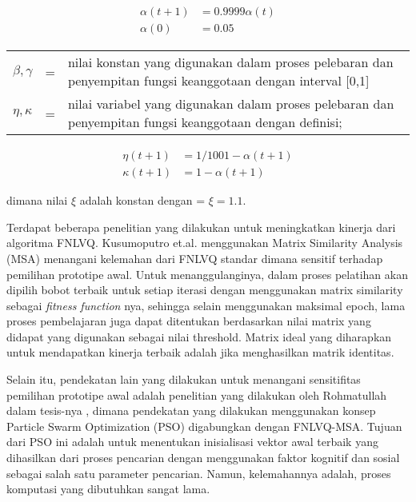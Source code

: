 \begin{small}
	\begin{align}\label{eq:learning_rate}
		\alpha(t+1) &= 0.9999 \alpha(t) \\[0.2cm]
		\alpha(0) &= 0.05 \nonumber
	\end{align}
\end{small}

\begin{tabular}{llp{}}
$\beta, \gamma$ &=& nilai konstan yang digunakan dalam proses pelebaran
dan penyempitan fungsi keanggotaan dengan interval [0,1] \\
$\eta, \kappa$ &=& nilai variabel yang digunakan dalam proses pelebaran
dan penyempitan fungsi keanggotaan dengan definisi;
\end{tabular}

\begin{small}
	\begin{align}\label{eq:fuzziness_value}
	\eta(t+1) &= 1/100 {1-\alpha(t+1)} \\[0.2cm]
	\kappa(t+1) &= 1 - \alpha(t+1) \nonumber
	\end{align}
\end{small}

\noindent dimana nilai $\xi$ adalah konstan dengan = $\xi=1.1$.

Terdapat beberapa penelitian yang dilakukan untuk meningkatkan
kinerja dari algoritma FNLVQ. Kusumoputro et.al. \cite{Kusumoputro:2002b} 
menggunakan Matrix Similarity Analysis (MSA) menangani kelemahan dari FNLVQ
standar dimana sensitif terhadap pemilihan prototipe awal. Untuk
menanggulanginya, dalam proses pelatihan akan dipilih bobot terbaik untuk
setiap iterasi dengan menggunakan matrix similarity sebagai  \emph{fitness
function} nya, sehingga selain menggunakan maksimal epoch, lama proses
pembelajaran juga dapat ditentukan berdasarkan nilai matrix yang didapat 
yang digunakan sebagai nilai threshold. Matrix ideal yang diharapkan untuk 
mendapatkan kinerja terbaik adalah jika menghasilkan matrik identitas.

Selain itu, pendekatan lain yang dilakukan untuk menangani
sensitifitas pemilihan prototipe awal adalah penelitian yang dilakukan oleh
Rohmatullah dalam tesis-nya \cite{Rochmatullah:2009}, dimana pendekatan yang
dilakukan menggunakan konsep Particle Swarm Optimization (PSO) digabungkan
dengan FNLVQ-MSA. Tujuan dari PSO ini adalah untuk menentukan inisialisasi
vektor awal terbaik yang dihasilkan dari proses pencarian dengan menggunakan
faktor kognitif dan sosial sebagai salah satu parameter pencarian. Namun,
kelemahannya adalah, proses komputasi yang dibutuhkan sangat lama.


% 













